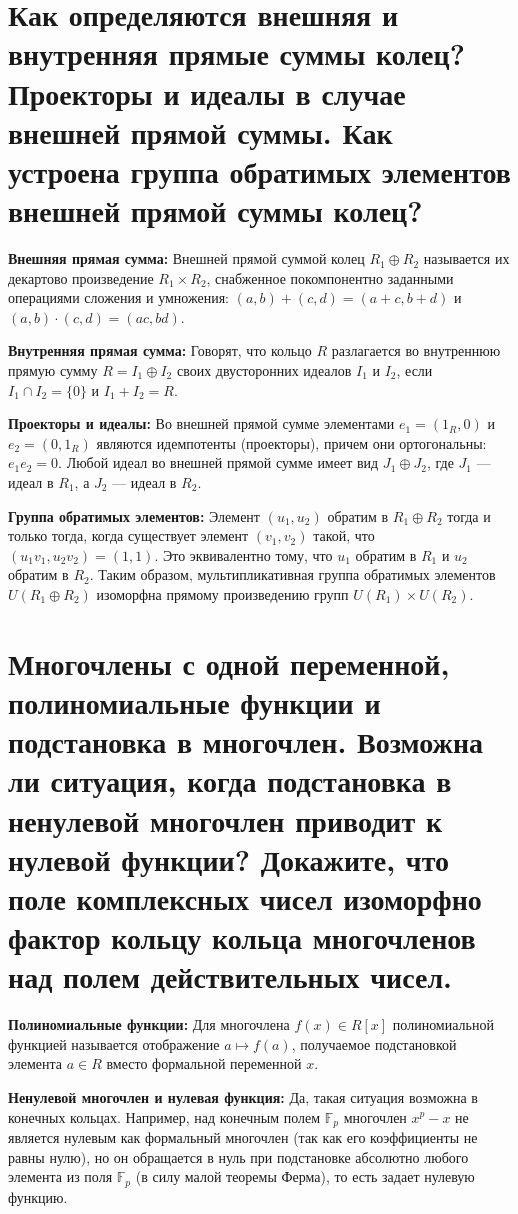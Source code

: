 \documentclass[12pt, a4paper]{article}
\theoremstyle{definition}
\theoremstyle{plain}
\begin{document}
	\newpage
	\section{Как определяются внешняя и внутренняя прямые суммы колец? Проекторы и идеалы в случае внешней прямой суммы. Как устроена группа обратимых элементов внешней прямой суммы колец?}
	
	\textbf{Внешняя прямая сумма:} Внешней прямой суммой колец $R_1 \oplus R_2$ называется их декартово произведение $R_1 \times R_2$, снабженное покомпонентно заданными операциями сложения и умножения: $(a, b) + (c, d) = (a+c, b+d)$ и $(a, b) \cdot (c, d) = (ac, bd)$.
	
	\textbf{Внутренняя прямая сумма:} Говорят, что кольцо $R$ разлагается во внутреннюю прямую сумму $R = I_1 \oplus I_2$ своих двусторонних идеалов $I_1$ и $I_2$, если $I_1 \cap I_2 = \{0\}$ и $I_1 + I_2 = R$.
	
	\textbf{Проекторы и идеалы:} Во внешней прямой сумме элементами $e_1 = (1_R, 0)$ и $e_2 = (0, 1_R)$ являются идемпотенты (проекторы), причем они ортогональны: $e_1 e_2 = 0$. Любой идеал во внешней прямой сумме имеет вид $J_1 \oplus J_2$, где $J_1$ — идеал в $R_1$, а $J_2$ — идеал в $R_2$.
	
	\textbf{Группа обратимых элементов:} Элемент $(u_1, u_2)$ обратим в $R_1 \oplus R_2$ тогда и только тогда, когда существует элемент $(v_1, v_2)$ такой, что $(u_1 v_1, u_2 v_2) = (1, 1)$. Это эквивалентно тому, что $u_1$ обратим в $R_1$ и $u_2$ обратим в $R_2$. Таким образом, мультипликативная группа обратимых элементов $U(R_1 \oplus R_2)$ изоморфна прямому произведению групп $U(R_1) \times U(R_2)$.
	
	\newpage
	\section{Многочлены с одной переменной, полиномиальные функции и подстановка в многочлен. Возможна ли ситуация, когда подстановка в ненулевой многочлен приводит к нулевой функции? Докажите, что поле комплексных чисел изоморфно фактор кольцу кольца многочленов над полем действительных чисел.}
	
	\textbf{Полиномиальные функции:} Для многочлена $f(x) \in R[x]$ полиномиальной функцией называется отображение $a \mapsto f(a)$, получаемое подстановкой элемента $a \in R$ вместо формальной переменной $x$.
	
	\textbf{Ненулевой многочлен и нулевая функция:} Да, такая ситуация возможна в конечных кольцах. Например, над конечным полем $\mathbb{F}_p$ многочлен $x^p - x$ не является нулевым как формальный многочлен (так как его коэффициенты не равны нулю), но он обращается в нуль при подстановке абсолютно любого элемента из поля $\mathbb{F}_p$ (в силу малой теоремы Ферма), то есть задает нулевую функцию.
	
\end{document}
